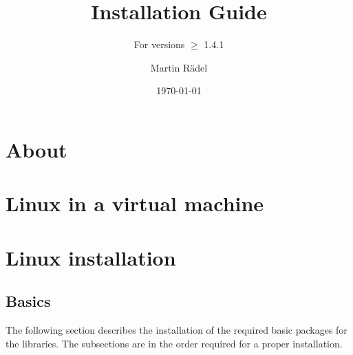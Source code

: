 \documentclass[%
  figures=plain,%
  listof=totoc,%
  bibliography=totoc,%
  fleqn,%
]{bootstrap_dlrreprt}                           %
\title       {\toolname{} Installation Guide}
\subtitle    {For \toolname{} versions $\ge$ 1.4.1}
\author      {Martin R\"adel}
\date        {\today}
\begin{document}


% 


\newpage                                       %

\chapter{About \texorpdfstring{\protect\marktool{\toolnameshort}}{\toolnameshort{}}}
\setcounter{currentlevel}{6}



\chapter{Linux in a virtual machine}
\setcounter{currentlevel}{6}


\chapter{\texorpdfstring{\protect\marktool{\toolnameshort}}{\toolnameshort{}} Linux installation}
\label{sec:Peridigm_Linux_Installation}
\setcounter{currentlevel}{6}


\newpage
\section{Basics}
\setcounter{currentlevel}{5}

The following section describes the installation of the required basic packages for the \marktool[\tooladdress]{\toolnameshort} libraries. The subsections are in the order required for a proper installation.







\end{document}
